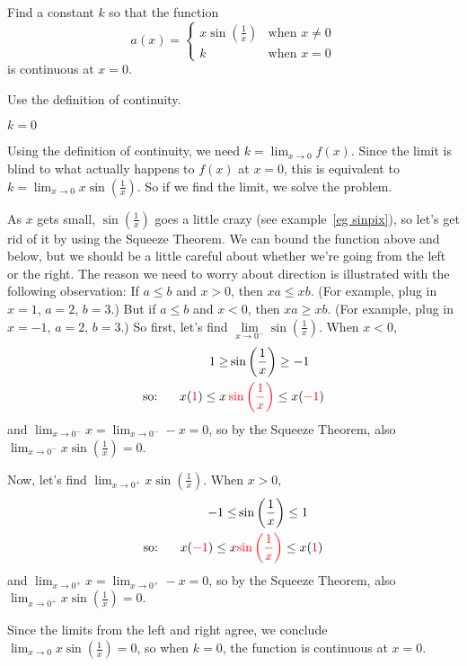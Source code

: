 \begin{Mquestion}Find a constant $k$ so that the function \[a(x)=\left\{\begin{array}{ll}
x\sin\left(\frac{1}{x}\right)&\mbox{when } x \neq 0\\
k&\mbox{when }x=0
\end{array}\right.\]
is continuous at $x=0$.
\end{Mquestion}
\begin{hint} Use the definition of continuity.
\end{hint}
\begin{answer}  $k=0$
\end{answer}
\begin{solution} Using the definition of continuity, we need $k=\displaystyle\lim_{x \rightarrow 0} f(x)$. Since the limit is blind to what actually happens to $f(x)$ at $x=0$, this is equivalent to $k=\displaystyle\lim_{x \rightarrow 0} x\sin\left(\frac{1}{x}\right)$. So if we find the limit, we solve the problem.

As $x$ gets small, $\sin\left(\frac{1}{x}\right)$ goes a little crazy (see example~\ref*{eg sinpix}), %
  so let's get rid of it by using the Squeeze Theorem. We can bound the function above and below, but we should be a little careful about whether we're going from the left or the right. The reason we need to worry about direction is illustrated with the following observation:
  If $a\le b$ and $x>0$, then $xa\le xb$. (For example,
           plug in $x=1$, $a=2$, $b=3$.) But if $a\le b$ and $x<0$,
           then $xa \ge xb$. (For example, plug in $x=-1$, $a=2$, $b=3$.)
           So first, let's find
           $\lim\limits_{x\rightarrow 0^-}\sin\left(\frac{1}{x}\right)$.
           When $x<0$,
           \begin{align*}
              1 \ge &\sin\left(\frac{1}{x}\right) \ge -1\\
            \mbox{so: }~~~~
              x(\textcolor{red}{1}) \le x\,&\textcolor{red}{\sin\left(\frac{1}{x}\right) }\le x(\textcolor{red}{-1})
           \end{align*}
and $\displaystyle\lim_{x \rightarrow 0^-} x = \displaystyle\lim_{x \rightarrow 0^-} -x = 0$, so by the Squeeze Theorem, also $\displaystyle\lim_{x \rightarrow 0^-} x\sin\left(\frac{1}{x}\right)=0$.

Now, let's find $\displaystyle\lim_{x \rightarrow 0^+} x\sin\left(\frac{1}{x}\right)$. When $x>0$,
\begin{align*}
 -1 \le &\sin\left(\frac{1}{x}\right) \le 1\\
\mbox{so: }~~~~
x(\textcolor{red}{-1}) \leq x&\textcolor{red}{\sin\left(\frac{1}{x}\right)}\leq x(\textcolor{red}{1})
\end{align*}
and $\displaystyle\lim_{x \rightarrow 0^+} x = \displaystyle\lim_{x \rightarrow 0^+} -x = 0$, so by the Squeeze Theorem, also $\displaystyle\lim_{x \rightarrow 0^+} x\sin\left(\frac{1}{x}\right)=0$.

Since the limits from the left and right agree, we conclude $\displaystyle\lim_{x \rightarrow 0} x\sin\left(\frac{1}{x}\right)=0$, so when $k=0$, the function is continuous at $x=0$.
\end{solution}

